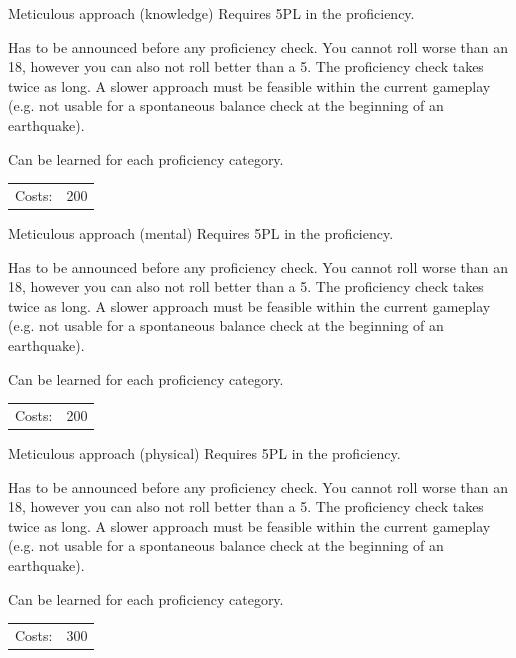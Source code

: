 \begin{skill}{Meticulous approach (knowledge)}
	\setlength{\parskip}{8pt}
	\setlength{\parindent}{0pt}
	Requires 5PL in the proficiency.

	Has to be announced before any proficiency check. You cannot roll worse than an 18, however you can also not roll better than a 5. The proficiency check takes twice as long. A slower approach must be feasible within the current gameplay (e.g. not usable for a spontaneous balance check at the beginning of an earthquake).

	Can be learned for each proficiency category.\\

	\hfill
	\begin{tabular}{rr}
		Costs: & 200 \\
	\end{tabular}
\end{skill}

\begin{skill}{Meticulous approach (mental)}
	\setlength{\parskip}{8pt}
	\setlength{\parindent}{0pt}
	Requires 5PL in the proficiency.

	Has to be announced before any proficiency check. You cannot roll worse than an 18, however you can also not roll better than a 5. The proficiency check takes twice as long. A slower approach must be feasible within the current gameplay (e.g. not usable for a spontaneous balance check at the beginning of an earthquake).

	Can be learned for each proficiency category.\\

	\hfill
	\begin{tabular}{rr}
		Costs: & 200 \\
	\end{tabular}
\end{skill}

\begin{skill}{Meticulous approach (physical)}
	\setlength{\parskip}{8pt}
	\setlength{\parindent}{0pt}
	Requires 5PL in the proficiency.

	Has to be announced before any proficiency check. You cannot roll worse than an 18, however you can also not roll better than a 5. The proficiency check takes twice as long. A slower approach must be feasible within the current gameplay (e.g. not usable for a spontaneous balance check at the beginning of an earthquake).

	Can be learned for each proficiency category.\\

	\hfill
	\begin{tabular}{rr}
		Costs: & 300 \\
	\end{tabular}
\end{skill}


